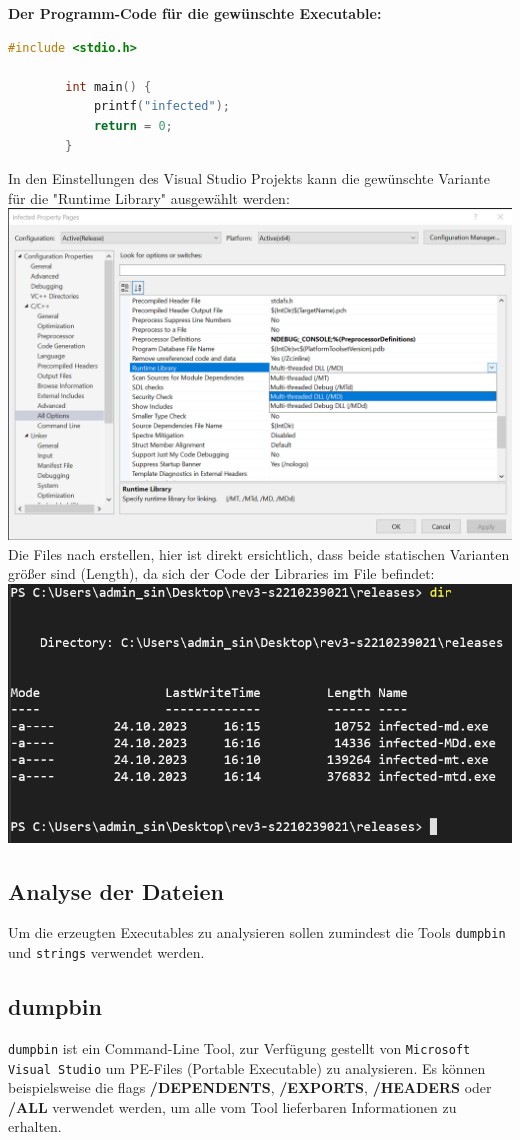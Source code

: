 \documentclass{article}
\begin{document}
	\noindent \textbf{Der Programm-Code für die gewünschte Executable:}\\
	\begin{lstlisting}[language=c]
		#include <stdio.h>
		
		int main() {
			printf("infected");
			return = 0;
		}
	\end{lstlisting}
	In den Einstellungen des Visual Studio Projekts kann die gewünschte Variante für die "Runtime Library" ausgewählt werden:\\
	\includegraphics[width=0.7\linewidth]{pictures/1. setting runtime library.png}\\
	Die Files nach erstellen, hier ist direkt ersichtlich, dass beide statischen Varianten größer sind (Length), da sich der Code der Libraries im File befindet:\\
	\includegraphics[width=0.5\linewidth]{pictures/1. all files.png}\\
	
	\pagebreak
	\subsection*{Analyse der Dateien}
	Um die erzeugten Executables zu analysieren sollen zumindest die Tools \texttt{dumpbin} und \texttt{strings} verwendet werden.\\
	\subsection*{dumpbin}
	\texttt{dumpbin} ist ein Command-Line Tool, zur Verfügung gestellt von \texttt{Microsoft Visual Studio} um PE-Files (Portable Executable) zu analysieren. Es können beispielsweise die flags \textbf{/DEPENDENTS}, \textbf{/EXPORTS}, \textbf{/HEADERS} oder \textbf{/ALL} verwendet werden, um alle vom Tool lieferbaren Informationen zu erhalten.\\
	
\end{document}
